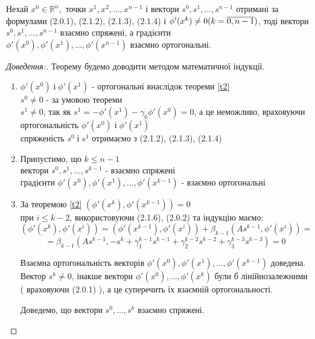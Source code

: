 \begin{thm} \label{t3}
	$ \text{Нехай } x^0 \in \mathbb{R}^n , \text{ точки } x^1, x^2, \ldots , x^{n-1} \text{ і вектори } s^0, s^1, \ldots, s^{n-1} $ отримані за формулами  (2.0.1), (2.1.2), (2.1.3), (2.1.4) і 
	$ \phi'(x^k) \neq 0 \\ (k = \overline{0,n-1}) $, тоді вектори $  s^0, s^1, \ldots, s^{n-1} $ взаємно спряжені, а градієнти \\ $  \phi'(x^0), \phi'(x^1), \ldots,  \phi'(x^{n-1}) $ взаємно ортогональні.
\end{thm}
\begin{proof}[Доведення:]
	Теорему будемо доводити методом математичної індукції.
	\begin{enumerate}
		\item $  \phi'(x^0) \; і \; \phi'(x^1) $ - ортогональні внаслідок теореми \ref{t2} \\
		$s^0 \neq 0 $ - за умовою теореми \\
		$s^1 \neq 0 $, так як $s^1 = - \phi'(x^1) - \gamma_0\phi'(x^0) = 0 $, а це неможливо, враховуючи ортогональність  $  \phi'(x^0) \; і \; \phi'(x^1) $ \\
		спряженість $s^0 \; і \; s^1 $ отримаємо з (2.1.2), (2.1.3), (2.1.4) 
		\item Припустимо, що $k \leq n - 1$ \\
		вектори $  s^0, s^1, \ldots, s^{k-1} $ -  взаємно спряжені \\
		градієнти  $  \phi'(x^0), \phi'(x^1), \ldots,  \phi'(x^{k-1}) $ - взаємно ортогональні
		\item За теоремою \ref{t2} $(\phi'(x^k), \phi'(x^{k-1})) = 0 $ \\
		при $ i \leq k - 2 $, використовуючи (2.1.6), (2.0.2) та індукцію маємо:
		$$ ( \phi'(x^k),  \phi'(x^i)) = (\phi'(x^{k-1}),  \phi'(x^i)) + \beta_{k-1}(As^{k-1},  \phi'(x^i)) = $$
		$$ = \beta_{k-1}(As^{k-1}, - s^k + \gamma_1^{k-1}s^{k-1} + \gamma_2^{k-2}s^{k-2} + \gamma_3^{k-3}s^{k-3}) = 0 $$ 
		
		Взаємна ортогональність векторів  $  \phi'(x^0), \phi'(x^1), \ldots,  \phi'(x^{k-1}) $ доведена. \\
		Вектор $s^k \neq 0 $, інакше вектори  $  \phi'(x^0), \ldots,  \phi'(x^k) $  були б лінійнозалежними ( враховуючи (2.0.1) ), а це суперечить їх взаємній ортогональності.
		
		Доведемо, що вектори $  s^0, \ldots, s^k $  взаємно спряжені.
		

\end{enumerate}
\end{proof}
